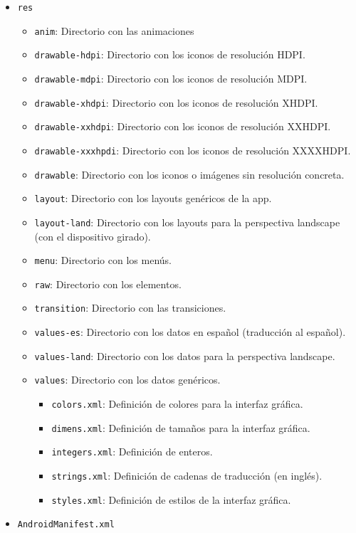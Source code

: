 \begin{itemize}
\begin{itemize}
  \item \texttt{res}
    \begin{itemize}
    \item \texttt{anim}: Directorio con las animaciones
    \item \texttt{drawable-hdpi}: Directorio con los iconos de resolución HDPI.
    \item \texttt{drawable-mdpi}: Directorio con los iconos de resolución MDPI.
    \item \texttt{drawable-xhdpi}: Directorio con los iconos de resolución
      XHDPI.
    \item \texttt{drawable-xxhdpi}: Directorio con los iconos de resolución
      XXHDPI.
    \item \texttt{drawable-xxxhpdi}: Directorio con los iconos de resolución
      XXXXHDPI.
    \item \texttt{drawable}: Directorio con los iconos o imágenes sin
      resolución concreta.
    \item \texttt{layout}: Directorio con los layouts genéricos de la app.
    \item \texttt{layout-land}: Directorio con los layouts para la perspectiva
      landscape (con el dispositivo girado).
    \item \texttt{menu}: Directorio con los menús.
    \item \texttt{raw}: Directorio con los elementos.
    \item \texttt{transition}: Directorio con las transiciones.
    \item \texttt{values-es}: Directorio con los datos en español (traducción
      al español).
    \item \texttt{values-land}: Directorio con los datos para la perspectiva
      landscape.
    \item \texttt{values}: Directorio con los datos genéricos.
      \begin{itemize}
      \item \texttt{colors.xml}: Definición de colores para la interfaz gráfica.
      \item \texttt{dimens.xml}: Definición de tamaños para la interfaz gráfica.
      \item \texttt{integers.xml}: Definición de enteros.
      \item \texttt{strings.xml}: Definición de cadenas de traducción (en inglés).
      \item \texttt{styles.xml}: Definición de estilos de la interfaz gráfica.
      \end{itemize}
    \end{itemize}
  \item \texttt{AndroidManifest.xml}
  \end{itemize}
\end{itemize}


